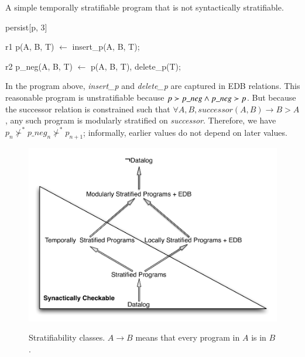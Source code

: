 \begin{example}
A simple temporally stratifiable \slang program that is not syntactically stratifiable.

\begin{Dedalus}
persist[p, 3]  
  
r1
p(A, B, T) \(\leftarrow\)
  insert\_p(A, B, T);

r2  
p_neg(A, B, T) \(\leftarrow\)
  p(A, B, T),
  delete\_p(T);
\end{Dedalus}

In the \slang program above, \emph{insert\_p} and \emph{delete\_p} are captured
in EDB relations.  This reasonable program is unstratifiable because $p \succ
p\nega \land p\nega \succ p$.  But because the successor relation is
constrained such that $\forall A,B, successor(A, B) \rightarrow B > A$, any
such program is modularly stratified on \emph{successor}.  Therefore, we have
$p_{n} \not\succ^* p\_neg_{n} \not\succ^* p_{n+1}$; informally, earlier values
do not depend on later values.
\end{example}

\begin{figure}[t]
  \centering
  \includegraphics[width=0.75\linewidth]{figures/dedalus_classes.pdf}
  \label{fig:dedalus-classes}
  \caption{Stratifiability classes.  $A \to B$ means that every program in $A$ is in $B$.}
\vspace{-8pt}
\end{figure}



